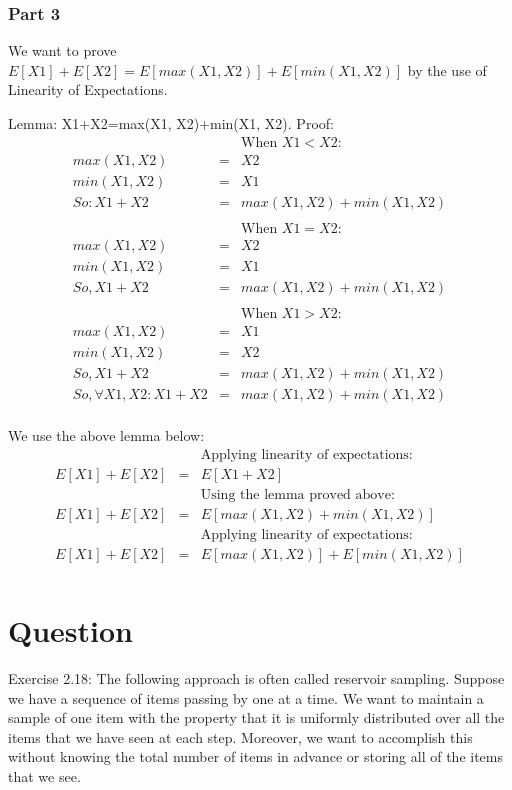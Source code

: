 \documentclass[10pt]{article}
\begin{document}
\subsubsection*{Part 3}
We want to prove $E[X1]+E[X2] = E[max(X1, X2)] + E[min(X1, X2)]$ by the use of Linearity of Expectations.

Lemma: X1+X2=max(X1, X2)+min(X1, X2).
Proof:
\begin{eqnarray}
&&\text{When $X1<X2$:}\\
max(X1, X2) &=& X2\\
min(X1, X2) &=& X1\\
So: X1+X2 &=& max(X1, X2)+min(X1, X2)\\
\\
&&\text{When $X1=X2$:}\\
max(X1, X2) &=& X2\\
min(X1, X2) &=& X1\\
So, X1+X2 &=& max(X1, X2)+min(X1, X2)\\
\\
&&\text{When $X1>X2$:}\\
max(X1, X2) &=& X1\\
min(X1, X2) &=& X2\\
So, X1+X2 &=& max(X1, X2)+min(X1, X2)\\
So, \forall X1,X2: X1+X2 &=& max(X1, X2)+min(X1, X2)\\
\end{eqnarray}

We use the above lemma below:
\begin{eqnarray}
&&\text{Applying linearity of expectations:}\\
E[X1]+E[X2] &=& E[X1+X2]\\
&&\text{Using the lemma proved above:}\\
E[X1]+E[X2] &=& E[max(X1, X2)+min(X1, X2)]\\
&&\text{Applying linearity of expectations:}\\
E[X1]+E[X2] &=& E[max(X1, X2)] + E[min(X1, X2)]\\
\end{eqnarray}


\section{Question}

Exercise 2.18: The following approach is often called reservoir sampling. Suppose we have a sequence of items passing by one at a time. We want to maintain a sample of one item with the property that it is uniformly distributed over all the items that we have seen at each step. Moreover, we want to accomplish this without knowing the total number of items in advance or storing all of the items that we see.
\end{document}
